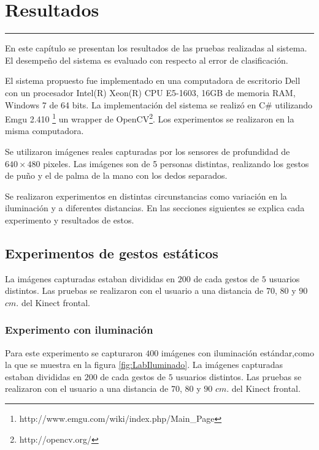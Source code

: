 \chapter{Resultados}\label{capit:cap5}
\vspace{-2.0325ex}%
\noindent
\rule{\textwidth}{0.5pt}
\vspace{-5.5ex}%
\newcommand{\pushline}{\Indp}%

En este capítulo se presentan los resultados de las pruebas realizadas al sistema. El desempeño del sistema es evaluado con respecto al error de clasificación.   

El sistema propuesto fue implementado en una computadora de escritorio Dell con un procesador Intel(R) Xeon(R) CPU E5-1603, 16GB de memoria RAM, Windows 7 de 64 bits. La implementación del sistema se realizó en C\# utilizando Emgu 2.410 \footnote{http://www.emgu.com/wiki/index.php/Main\_Page} un wrapper de OpenCV\footnote{http://opencv.org/}. Los experimentos se realizaron en la misma computadora. 

Se utilizaron imágenes reales capturadas por los sensores de profundidad de $640 \times 480$ pixeles. Las imágenes son de 5 personas distintas, realizando los gestos de puño y el de palma de la mano con los dedos separados.   

Se realizaron experimentos en distintas circunstancias como variación en la iluminación y a diferentes distancias. En las secciones siguientes se explica cada experimento y resultados de estos.  

\section{Experimentos de gestos estáticos}\label{TestStaticGestures}  

La imágenes capturadas estaban divididas en $200$ de cada gestos de $5$ usuarios distintos. Las pruebas se realizaron con el usuario a una  distancia de $70$, $80$ y $90$ $cm.$ del Kinect frontal. 

\subsection{Experimento con iluminación} 
Para este experimento se capturaron $400$ imágenes con iluminación estándar,como la que se muestra en la figura \ref{fig:LabIluminado}. La imágenes capturadas estaban divididas en $200$ de cada gestos de $5$ usuarios distintos. Las pruebas se realizaron con el usuario a una  distancia de $70$, $80$ y $90$ $cm.$ del Kinect frontal. 

